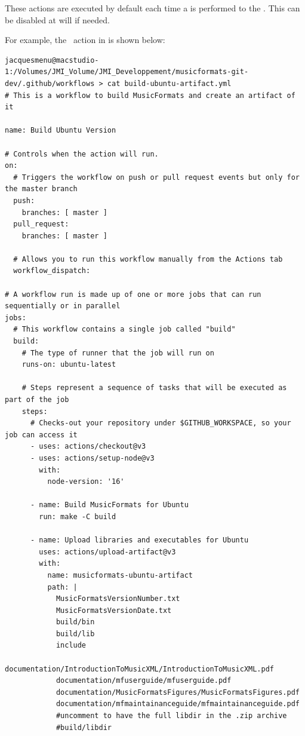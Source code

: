 These actions are executed by default each time a  is performed to the \masterBranch. This can be disabled at will if needed.

For example, the \Ubuntu\ action in  is shown below:
\begin{lstlisting}[language=Terminal]
jacquesmenu@macstudio-1:/Volumes/JMI_Volume/JMI_Developpement/musicformats-git-dev/.github/workflows > cat build-ubuntu-artifact.yml
# This is a workflow to build MusicFormats and create an artifact of it

name: Build Ubuntu Version

# Controls when the action will run.
on:
  # Triggers the workflow on push or pull request events but only for the master branch
  push:
    branches: [ master ]
  pull_request:
    branches: [ master ]

  # Allows you to run this workflow manually from the Actions tab
  workflow_dispatch:

# A workflow run is made up of one or more jobs that can run sequentially or in parallel
jobs:
  # This workflow contains a single job called "build"
  build:
    # The type of runner that the job will run on
    runs-on: ubuntu-latest

    # Steps represent a sequence of tasks that will be executed as part of the job
    steps:
      # Checks-out your repository under $GITHUB_WORKSPACE, so your job can access it
      - uses: actions/checkout@v3
      - uses: actions/setup-node@v3
        with:
          node-version: '16'

      - name: Build MusicFormats for Ubuntu
        run: make -C build

      - name: Upload libraries and executables for Ubuntu
        uses: actions/upload-artifact@v3
        with:
          name: musicformats-ubuntu-artifact
          path: |
            MusicFormatsVersionNumber.txt
            MusicFormatsVersionDate.txt
            build/bin
            build/lib
            include
            documentation/IntroductionToMusicXML/IntroductionToMusicXML.pdf
            documentation/mfuserguide/mfuserguide.pdf
            documentation/MusicFormatsFigures/MusicFormatsFigures.pdf
            documentation/mfmaintainanceguide/mfmaintainanceguide.pdf
            #uncomment to have the full libdir in the .zip archive
            #build/libdir
\end{lstlisting}

